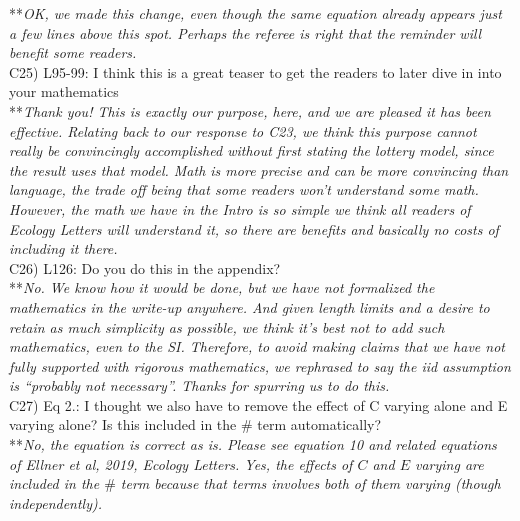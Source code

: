 \documentclass[letterpaper,11pt]{article}
\begin{document}
\noindent ***\emph{OK, we made this change, even though the same equation already appears just a few lines
above this spot. Perhaps the referee is right that the reminder will benefit some readers.} \\

\noindent C25) L95-99: I think this is a great teaser to get the readers to later dive in into your mathematics \\

\noindent ***\emph{Thank you! This is exactly our purpose, here, and we are pleased it has been effective.
Relating back to our response to C23, we think this purpose cannot really be convincingly accomplished
without first stating the lottery model, since the result uses that model. Math is more precise and can be
more convincing than language, the trade off being that some readers won't understand some math. However, the 
math we have in the Intro is so simple we think all readers of Ecology Letters will understand it, so there are
benefits and basically no costs of including it there. } \\

\noindent C26) L126: Do you do this in the appendix? \\

\noindent ***\emph{No. We know how it would be done, but we have not formalized the mathematics
in the write-up anywhere. And given length limits and a desire to retain as much simplicity as possible,
we think it's best not to add such mathematics, even to the SI. 
Therefore, to avoid making claims that we have not fully supported
with rigorous mathematics, we rephrased to say the iid assumption is 
``probably not necessary''. Thanks for spurring us to do this.} \\

\noindent C27) Eq 2.: I thought we also have to remove the effect of C varying alone and E varying alone? Is this included in the $\#$ term automatically? \\

\noindent ***\emph{No, the equation is correct as is. Please see equation 10 and related equations of 
Ellner et al, 2019, Ecology Letters. Yes, the effects of $C$ and $E$ varying are included in 
the $\#$ term because that terms involves both of them varying (though independently).}
\end{document}
